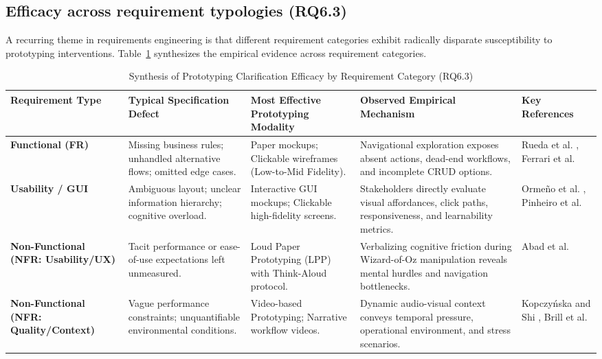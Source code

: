 \documentclass[conference]{IEEEtran}
\begin{document}
\subsection{Efficacy across requirement typologies (RQ6.3)}
A recurring theme in requirements engineering is that different requirement categories exhibit radically disparate susceptibility to prototyping interventions. Table~\ref{tab:req_typology} synthesizes the empirical evidence across requirement categories.

\begin{table}[t]
\centering
\caption{Synthesis of Prototyping Clarification Efficacy by Requirement Category (RQ6.3)}
\label{tab:req_typology}
\begin{tabularx}{\textwidth}{>{\hsize=0.75\hsize\raggedright\arraybackslash}X >{\hsize=0.95\hsize\raggedright\arraybackslash}X >{\hsize=0.95\hsize\raggedright\arraybackslash}X >{\hsize=1.55\hsize\raggedright\arraybackslash}X >{\hsize=0.80\hsize\raggedright\arraybackslash}X}
\toprule
\textbf{Requirement Type} & \textbf{Typical Specification Defect} & \textbf{Most Effective Prototyping Modality} & \textbf{Observed Empirical Mechanism} & \textbf{Key References} \\
\midrule
\textbf{Functional (FR)} & Missing business rules; unhandled alternative flows; omitted edge cases. & Paper mockups; Clickable wireframes (Low-to-Mid Fidelity). & Navigational exploration exposes absent actions, dead-end workflows, and incomplete CRUD options. & Rueda et al. \cite{rueda2020requirements}, Ferrari et al. \cite{rej2022evolve} \\
\addlinespace
\textbf{Usability / GUI} & Ambiguous layout; unclear information hierarchy; cognitive overload. & Interactive GUI mockups; Clickable high-fidelity screens. & Stakeholders directly evaluate visual affordances, click paths, responsiveness, and learnability metrics. & Orme{\~n}o et al. \cite{uv2023empirical}, Pinheiro et al. \cite{jserd2019protopersona} \\
\addlinespace
\textbf{Non-Functional (NFR: Usability/UX)} & Tacit performance or ease-of-use expectations left unmeasured. & Loud Paper Prototyping (LPP) with Think-Aloud protocol. & Verbalizing cognitive friction during Wizard-of-Oz manipulation reveals mental hurdles and navigation bottlenecks. & Abad et al. \cite{abad2018loud} \\
\addlinespace
\textbf{Non-Functional (NFR: Quality/Context)} & Vague performance constraints; unquantifiable environmental conditions. & Video-based Prototyping; Narrative workflow videos. & Dynamic audio-visual context conveys temporal pressure, operational environment, and stress scenarios. & Kopczy{\'n}ska and Shi \cite{bano2023videos}, Brill et al. \cite{brill2010videos} \\
\bottomrule
\end{tabularx}
\end{table}
\end{document}
